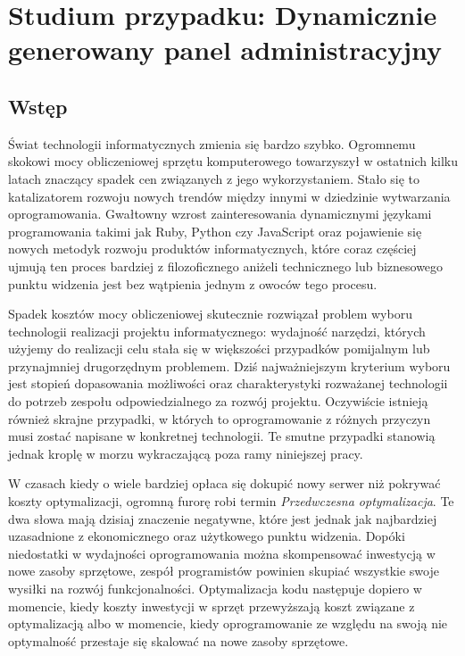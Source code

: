 
\chapter[Studium przypadku: Dynamicznie generowany panel administracyjny]{Studium przypadku: Dynamicznie generowany panel administracyjny}
  \section{Wstęp}
  Świat technologii informatycznych zmienia się bardzo szybko. Ogromnemu skokowi mocy obliczeniowej sprzętu komputerowego towarzyszył w ostatnich kilku latach znaczący spadek cen związanych z jego wykorzystaniem. Stało się to katalizatorem rozwoju nowych trendów między innymi w dziedzinie wytwarzania oprogramowania. Gwałtowny wzrost zainteresowania dynamicznymi językami programowania takimi jak Ruby, Python czy JavaScript oraz pojawienie się nowych metodyk rozwoju produktów informatycznych, które coraz częściej ujmują ten proces bardziej z filozoficznego aniżeli technicznego lub biznesowego punktu widzenia jest bez wątpienia jednym z owoców tego procesu.
  
  Spadek kosztów mocy obliczeniowej skutecznie rozwiązał problem wyboru technologii realizacji projektu informatycznego: wydajność narzędzi, których użyjemy do realizacji celu stała się w większości przypadków pomijalnym lub przynajmniej drugorzędnym problemem. Dziś najważniejszym kryterium wyboru jest stopień dopasowania możliwości oraz charakterystyki rozważanej technologii do potrzeb zespołu odpowiedzialnego za rozwój projektu. Oczywiście istnieją również skrajne przypadki, w których to oprogramowanie z różnych przyczyn musi zostać napisane w konkretnej technologii. Te smutne przypadki stanowią jednak kroplę w morzu wykraczającą poza ramy niniejszej pracy.
  
  W czasach kiedy o wiele bardziej opłaca się dokupić nowy serwer niż pokrywać koszty optymalizacji, ogromną furorę robi termin \emph{Przedwczesna optymalizacja}. Te dwa słowa mają dzisiaj znaczenie negatywne, które jest jednak jak najbardziej uzasadnione z ekonomicznego oraz użytkowego punktu widzenia. Dopóki niedostatki w wydajności oprogramowania można skompensować inwestycją w nowe zasoby sprzętowe, zespół programistów powinien skupiać wszystkie swoje wysiłki na rozwój funkcjonalności. Optymalizacja kodu następuje dopiero w momencie, kiedy koszty inwestycji w sprzęt przewyższają koszt związane z optymalizacją albo w momencie, kiedy oprogramowanie ze względu na swoją nie optymalność przestaje się skalować na nowe zasoby sprzętowe.
  
